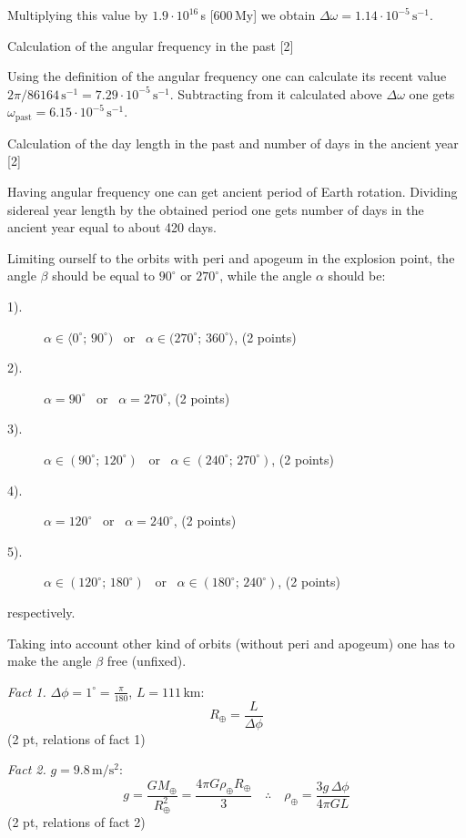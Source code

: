 Multiplying this value by $1.9\cdot10^{16}$\,s [600\,My] we obtain
$\Delta\omega = 1.14\cdot10^{-5}\,\mathrm{s}^{-1}$.

Calculation of the angular frequency in the past \hfill[2]

Using the definition of the angular frequency one can calculate its recent
value $2\pi/86164\,\mathrm{s}^{-1} = 7.29\cdot10^{-5}\,\mathrm{s}^{-1}$.
Subtracting from it calculated above $\Delta\omega$ one gets
$\omega_{\mathrm{past}} = 6.15\cdot10^{-5}\,\mathrm{s}^{-1}$.

Calculation of the day length in the past and number of days in the ancient
year \hfill[2]

Having angular frequency one can get ancient period of Earth rotation.
Dividing sidereal year length by the obtained period one gets number of days
in the ancient year equal to about 420 days.

Limiting ourself to the orbits with peri and apogeum in the explosion point,
the angle $\beta$ should be equal to $90^\circ$ or $270^\circ$, while the
angle $\alpha$ should be:

\begin{description}
\item[1).] $\alpha \in \langle 0^\circ;\, 90^\circ)$ \ or \
  $\alpha \in (270^\circ;\, 360^\circ\rangle$, \hfill(2 points)
\item[2).] $\alpha = 90^\circ$ \ or \ $\alpha = 270^\circ$, \hfill(2 points)
\item[3).] $\alpha \in (90^\circ;\, 120^\circ)$ \ or \
  $\alpha \in (240^\circ;\, 270^\circ)$, \hfill(2 points)
\item[4).] $\alpha = 120^\circ$ \ or \ $\alpha = 240^\circ$, \hfill(2 points)
\item[5).] $\alpha \in (120^\circ;\, 180^\circ)$ \ or \
  $\alpha \in (180^\circ;\, 240^\circ)$, \hfill(2 points)
\end{description}
respectively.

Taking into account other kind of orbits (without peri and apogeum) one has to
make the angle $\beta$ free (unfixed).

\solhead{2.17}{}
\emph{Fact 1.} $\Delta\phi = 1^\circ = \frac{\pi}{180}$, $L = 111$\,km:
\[ R_\oplus = \frac{L}{\Delta\phi} \]
\hfill(2 pt, relations of fact 1)

\emph{Fact 2.} $g = 9.8\,\mathrm{m/s^2}$:
\[ g = \frac{GM_\oplus}{R_\oplus^2} = \frac{4\pi G \rho_\oplus R_\oplus}{3}
   \quad\therefore\quad
   \rho_\oplus = \frac{3g\,\Delta\phi}{4\pi G L} \]
\hfill(2 pt, relations of fact 2)


